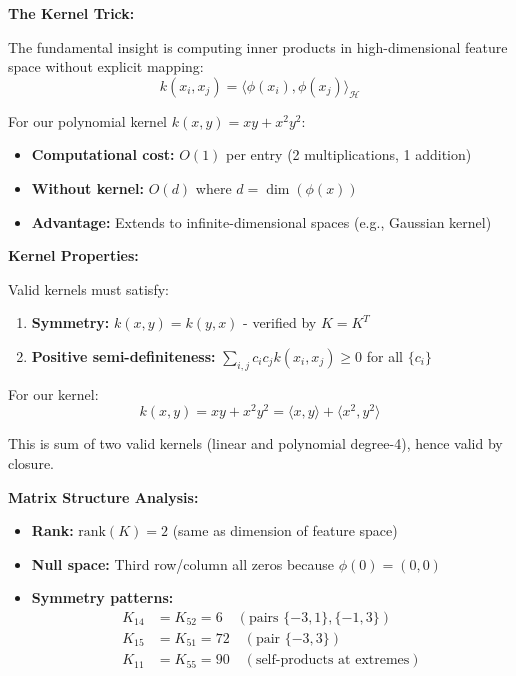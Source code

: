 \documentclass[12pt]{article}
\begin{document}
\begin{explanation}

\textbf{The Kernel Trick:}

The fundamental insight is computing inner products in high-dimensional feature space without explicit mapping:
\[
k(x_i, x_j) = \langle \phi(x_i), \phi(x_j) \rangle_{\mathcal{H}}
\]

For our polynomial kernel $k(x, y) = xy + x^2y^2$:
\begin{itemize}
    \item \textbf{Computational cost:} $O(1)$ per entry (2 multiplications, 1 addition)
    \item \textbf{Without kernel:} $O(d)$ where $d = \dim(\phi(x))$
    \item \textbf{Advantage:} Extends to infinite-dimensional spaces (e.g., Gaussian kernel)
\end{itemize}

\textbf{Kernel Properties:}

Valid kernels must satisfy:
\begin{enumerate}
    \item \textbf{Symmetry:} $k(x, y) = k(y, x)$ - verified by $K = K^T$
    \item \textbf{Positive semi-definiteness:} $\sum_{i,j} c_i c_j k(x_i, x_j) \geq 0$ for all $\{c_i\}$
\end{enumerate}

For our kernel:
\[
k(x, y) = xy + x^2y^2 = \langle x, y \rangle + \langle x^2, y^2 \rangle
\]

This is sum of two valid kernels (linear and polynomial degree-4), hence valid by closure.

\textbf{Matrix Structure Analysis:}

\begin{itemize}
    \item \textbf{Rank:} $\text{rank}(K) = 2$ (same as dimension of feature space)
    \item \textbf{Null space:} Third row/column all zeros because $\phi(0) = (0, 0)$
    \item \textbf{Symmetry patterns:}
    \begin{align*}
    K_{14} &= K_{52} = 6 \quad (\text{pairs } \{-3, 1\}, \{-1, 3\}) \\
    K_{15} &= K_{51} = 72 \quad (\text{pair } \{-3, 3\}) \\
    K_{11} &= K_{55} = 90 \quad (\text{self-products at extremes})
    \end{align*}
\end{itemize}


\end{explanation}
\end{document}
